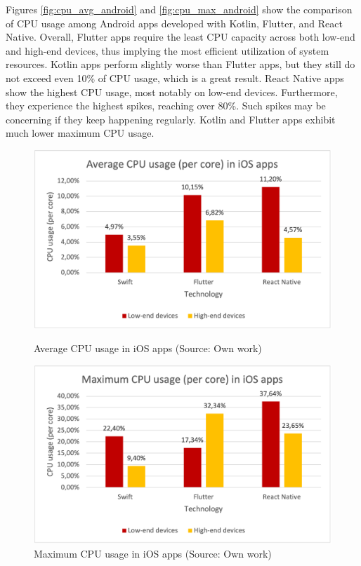 Figures \ref{fig:cpu_avg_android} and \ref{fig:cpu_max_android} show the comparison of CPU usage among Android apps developed with Kotlin, Flutter, and React Native. Overall, Flutter apps require the least CPU capacity across both low-end and high-end devices, thus implying the most efficient utilization of system resources. Kotlin apps perform slightly worse than Flutter apps, but they still do not exceed even 10\% of CPU usage, which is a great result. React Native apps show the highest CPU usage, most notably on low-end devices. Furthermore, they experience the highest spikes, reaching over 80\%. Such spikes may be concerning if they keep happening regularly. Kotlin and Flutter apps exhibit much lower maximum CPU usage.

\begin{figure}[H]
    \begin{minipage}{.48\textwidth}
        \includegraphics[width=\textwidth]{img/cpu_average_ios}
        \caption{Average CPU usage in iOS apps (Source: Own work)}
        \label{fig:cpu_avg_ios}
    \end{minipage}
    \hfill
    \begin{minipage}{.48\textwidth}
        \includegraphics[width=\textwidth]{img/cpu_max_ios}
        \caption{Maximum CPU usage in iOS apps (Source: Own work)}
        \label{fig:cpu_max_ios}
    \end{minipage}
\end{figure}

